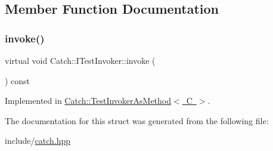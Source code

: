 \subsection{Member Function Documentation}
\mbox{\label{struct_catch_1_1_i_test_invoker_a6fcd5c5b67d6d5ade6491ff33411ca7f}} 
\subsubsection{\texorpdfstring{invoke()}{invoke()}}
{\footnotesize\ttfamily virtual void Catch\+::\+I\+Test\+Invoker\+::invoke (\begin{DoxyParamCaption}{ }\end{DoxyParamCaption}) const\hspace{0.3cm}{\ttfamily [pure virtual]}}



Implemented in \mbox{\hyperlink{class_catch_1_1_test_invoker_as_method_a8115a06efe273f4112ec0b5452c1b5f2}{Catch\+::\+Test\+Invoker\+As\+Method$<$ C $>$}}.



The documentation for this struct was generated from the following file\+:\begin{DoxyCompactItemize}
\item 
include/\mbox{\hyperlink{catch_8hpp}{catch.\+hpp}}\end{DoxyCompactItemize}
